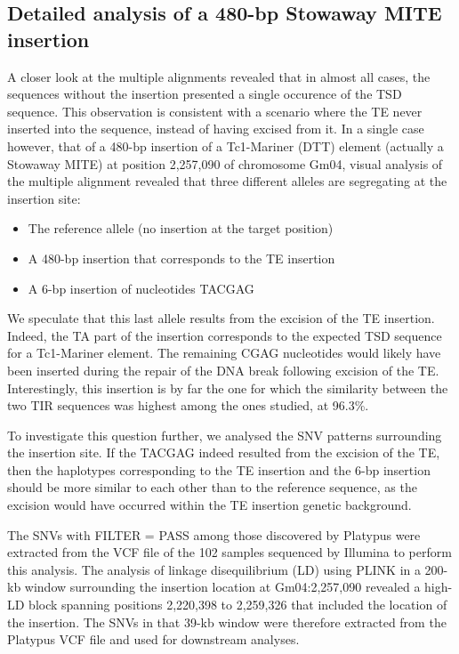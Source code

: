 \documentclass[12pt]{article}
\begin{document}
\subsection{Detailed analysis of a 480-bp Stowaway MITE insertion}

A closer look at the multiple alignments revealed that in almost all cases, the sequences without the insertion presented a single occurence of the TSD sequence.
This observation is consistent with a scenario where the TE never inserted into the sequence, instead of having excised from it.
In a single case however, that of a 480-bp insertion of a Tc1-Mariner (DTT) element (actually a Stowaway MITE) at position 2,257,090 of chromosome Gm04, visual analysis of the multiple alignment revealed that three different alleles are segregating at the insertion site:

\begin{itemize}
	\item The reference allele (no insertion at the target position)
	\item A 480-bp insertion that corresponds to the TE insertion
	\item A 6-bp insertion of nucleotides TACGAG 
\end{itemize}

We speculate that this last allele results from the excision of the TE insertion.
Indeed, the TA part of the insertion corresponds to the expected TSD sequence for a Tc1-Mariner element.
The remaining CGAG nucleotides would likely have been inserted during the repair of the DNA break following excision of the TE.
Interestingly, this insertion is by far the one for which the similarity between the two TIR sequences was highest among the ones studied, at 96.3\%.

To investigate this question further, we analysed the SNV patterns surrounding the insertion site.
If the TACGAG indeed resulted from the excision of the TE, then the haplotypes corresponding to the TE insertion and the 6-bp insertion should be more similar to each other than to the reference sequence, as the excision would have occurred within the TE insertion genetic background.

The SNVs with FILTER = PASS among those discovered by Platypus \citep{platypus} were extracted from the VCF file of the 102 samples sequenced by Illumina to perform this analysis.
The analysis of linkage disequilibrium (LD) using PLINK \citep{plink} in a 200-kb window surrounding the insertion location at Gm04:2,257,090 revealed a high-LD block spanning positions 2,220,398 to 2,259,326 that included the location of the insertion.
The SNVs in that 39-kb window were therefore extracted from the Platypus VCF file and used for downstream analyses.
\end{document}
